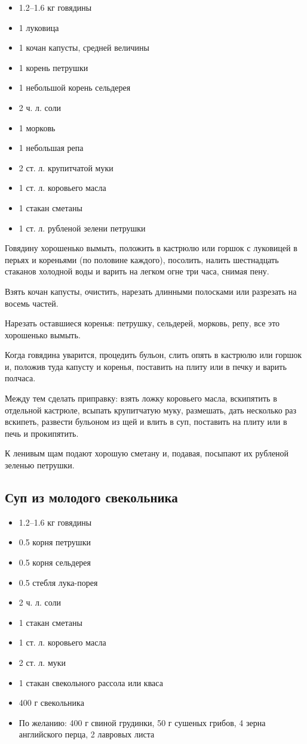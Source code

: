 \begin{itemize}
	\item 1.2–1.6 кг говядины 
	\item 1 луковица 
	\item 1 кочан капусты, средней величины 
	\item 1 корень петрушки 
	\item 1 небольшой корень сельдерея 
	\item 2 ч. л. соли 
	\item 1 морковь 
	\item 1 небольшая репа 
	\item 2 ст. л. крупитчатой муки 
	\item 1 ст. л. коровьего масла 
	\item 1 стакан сметаны 
	\item 1 ст. л. рубленой зелени петрушки
\end{itemize}

Говядину хорошенько вымыть, положить в кастрюлю или горшок с луковицей в перьях и кореньями (по половине каждого), посолить, налить шестнадцать стаканов холодной воды и варить на легком огне три часа, снимая пену.

Взять кочан капусты, очистить, нарезать длинными полосками или разрезать на восемь частей.

Нарезать оставшиеся коренья: петрушку, сельдерей, морковь, репу, все это хорошенько вымыть.

Когда говядина уварится, процедить бульон, слить опять в кастрюлю или горшок и, положив туда капусту и коренья, поставить на плиту или в печку и варить полчаса.

Между тем сделать приправку: взять ложку коровьего масла, вскипятить в отдельной кастрюле, всыпать крупитчатую муку, размешать, дать несколько раз вскипеть, развести бульоном из щей и влить в суп, поставить на плиту или в печь и прокипятить.

К ленивым щам подают хорошую сметану и, подавая, посыпают их рубленой зеленью петрушки.

\subsection{Суп из молодого свекольника}\label{24sup-molod-svek}

\begin{itemize}
	\item 1.2–1.6 кг говядины 
	\item 0.5 корня петрушки 
	\item 0.5 корня сельдерея 
	\item 0.5 стебля лука-порея 
	\item 2 ч. л. соли 
	\item 1 стакан сметаны 
	\item 1 ст. л. коровьего масла 
	\item 2 ст. л. муки 
	\item 1 стакан свекольного рассола или кваса 
	\item 400 г свекольника    
	\item По желанию: 400 г свиной грудинки, 50 г сушеных грибов, 4 зерна английского перца, 2 лавровых листа
\end{itemize}


